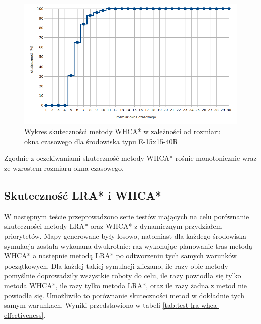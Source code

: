 \begin{figure}
	\centering
	\includegraphics[width=0.8\columnwidth]{img/plots/test-whca-window-E-15x15-40R}
	\caption{Wykres skuteczności metody WHCA* w zależności od rozmiaru okna czasowego dla środowiska typu E-15x15-40R}
	\label{fig:test-whca-window-E-15x15-40R}
\end{figure}

Zgodnie z oczekiwaniami skuteczność metody WHCA* rośnie monotonicznie wraz ze wzrostem rozmiaru okna czasowego.

\subsection{Skuteczność LRA* i WHCA*} %
W następnym teście przeprowadzono serie testów mających na celu porównanie skuteczności metody LRA* oraz WHCA* z dynamicznym przydziałem priorytetów.
Mapy generowane były losowo, natomiast dla każdego środowiska symulacja została wykonana dwukrotnie: raz wykonując planowanie tras metodą WHCA* a następnie metodą LRA* po odtworzeniu tych samych warunków początkowych. Dla każdej takiej symulacji zliczano, ile razy obie metody pomyślnie doprowadziły wszystkie roboty do celu, ile razy powiodła się tylko metoda WHCA*, ile razy tylko metoda LRA*, oraz ile razy żadna z metod nie powiodła się.
Umożliwiło to porównanie skuteczności metod w dokładnie tych samym warunkach. Wyniki przedstawiono w tabeli \ref{tab:test-lra-whca-effectiveness}.


